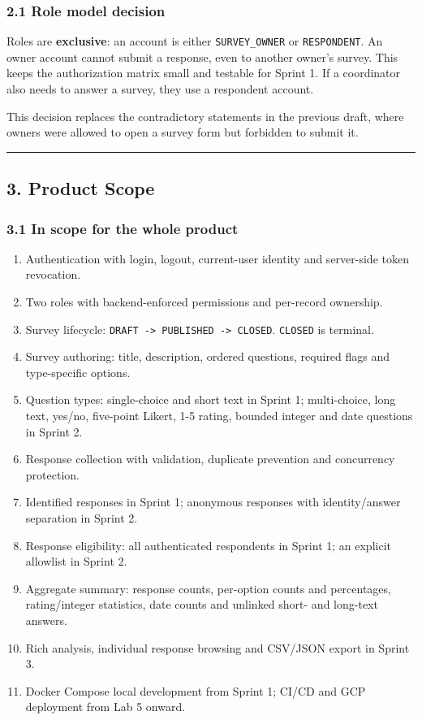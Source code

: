 \documentclass[12pt,a4paper]{article}
\begin{document}
\subsubsection*{2.1 Role model decision}
Roles are \textbf{exclusive}: an account is either \texttt{SURVEY\_OWNER} or \texttt{RESPONDENT}. An owner account cannot submit a response, even to another owner's survey. This keeps the authorization matrix small and testable for Sprint 1. If a coordinator also needs to answer a survey, they use a respondent account.

This decision replaces the contradictory statements in the previous draft, where owners were allowed to open a survey form but forbidden to submit it.

\medskip\noindent\rule{\linewidth}{0.4pt}\medskip

\subsection*{3. Product Scope}
\subsubsection*{3.1 In scope for the whole product}
\begin{enumerate}[leftmargin=*]
\item Authentication with login, logout, current-user identity and server-side token revocation.
\item Two roles with backend-enforced permissions and per-record ownership.
\item Survey lifecycle: \texttt{DRAFT -> PUBLISHED -> CLOSED}. \texttt{CLOSED} is terminal.
\item Survey authoring: title, description, ordered questions, required flags and type-specific options.
\item Question types: single-choice and short text in Sprint 1; multi-choice, long text, yes/no, five-point Likert, 1-5 rating, bounded integer and date questions in Sprint 2.
\item Response collection with validation, duplicate prevention and concurrency protection.
\item Identified responses in Sprint 1; anonymous responses with identity/answer separation in Sprint 2.
\item Response eligibility: all authenticated respondents in Sprint 1; an explicit allowlist in Sprint 2.
\item Aggregate summary: response counts, per-option counts and percentages, rating/integer statistics, date counts and unlinked short- and long-text answers.
\item Rich analysis, individual response browsing and CSV/JSON export in Sprint 3.
\item Docker Compose local development from Sprint 1; CI/CD and GCP deployment from Lab 5 onward.
\end{enumerate}
\end{document}
